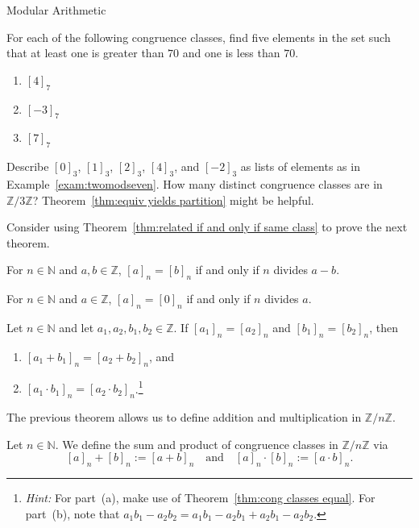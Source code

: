 \begin{section}{Modular Arithmetic}
\begin{problem}
For each of the following congruence classes, find five elements in the set such that at least one is greater than $70$ and one is less than $70$.
\begin{enumerate}[label=\textrm{(\alph*)}]
\item $[4]_7$ 
\item $[-3]_7$
\item $[7]_7$
\end{enumerate}
\end{problem}

\begin{problem}
Describe $[0]_3$, $[1]_3$, $[2]_3$, $[4]_3$, and $[-2]_3$ as lists of elements as in Example~\ref{exam:twomodseven}. How many distinct congruence classes are in $\mathbb{Z}/3\mathbb{Z}$? Theorem~\ref{thm:equiv yields partition} might be helpful.
\end{problem}

Consider using Theorem~\ref{thm:related if and only if same class} to prove the next theorem.

\begin{theorem}\label{thm:cong classes equal}
For $n\in \mathbb{N}$ and $a,b\in \mathbb{Z}$, $[a]_n = [b]_n$ if and only if $n$ divides $a-b$. 
\end{theorem}

\begin{corollary}\label{cor:divisible iff zero mod}
For $n\in \mathbb{N}$ and $a\in \mathbb{Z}$, $[a]_n = [0]_n$ if and only if $n$ divides $a$.
\end{corollary}

\begin{theorem}
Let $n\in \mathbb{N}$ and let $a_1,a_2,b_1,b_2 \in \mathbb{Z}$. If $[a_1]_n = [a_2]_n$ and $[b_1]_n = [b_2]_n$, then 
\begin{enumerate}[label=\textrm{(\alph*)}]
\item $[a_1+b_1]_n = [a_2+b_2]_n$, and
\item $[a_1\cdot b_1]_n = [a_2\cdot b_2]_n$.\footnote{\emph{Hint:} For part~(a), make use of Theorem~\ref{thm:cong classes equal}. For part~(b), note that $a_1b_1-a_2b_2 = a_1b_1 -a_2b_1 + a_2b_1-a_2b_2$.}
\end{enumerate}
\end{theorem}

The previous theorem allows us to define addition and multiplication in $\mathbb{Z}/n\mathbb{Z}$. 

\begin{definition}\label{def:modular arithmetic}
Let $n\in \mathbb{N}$. We define the sum and product of congruence classes in $\mathbb{Z}/n\mathbb{Z}$ via
\[
[a]_n + [b]_n:=[a+b]_n \quad \text{and} \quad [a]_n \cdot [b]_n:=[a\cdot b]_n.
\]
\end{definition}


\end{section}
